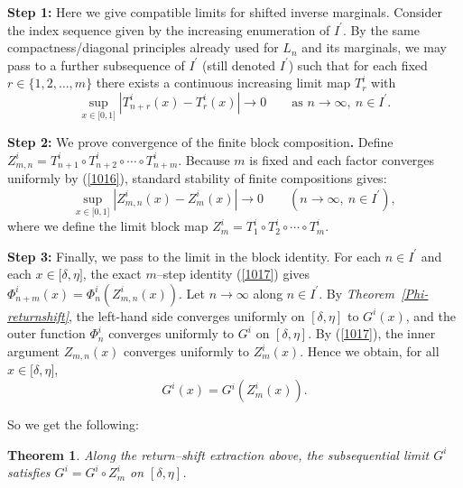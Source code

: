 \documentclass[onecolumn]{article}
\newtheorem{theorem}{Theorem}
\begin{document}
\medskip \noindent \textbf{Step 1: }Here we give compatible limits for
shifted inverse marginals. Consider the index sequence given by the
increasing enumeration of $I^{\prime }$. By the same compactness/diagonal
principles already used for $L_{n}$ and its marginals, we may pass to a
further subsequence of $I^{\prime }$ (still denoted $I^{\prime }$) such that
for each fixed $r\in \{1,2,\dots ,m\}$ there exists a continuous increasing
limit map $T_{r}^{i}$ with 
\begin{equation}
\sup_{x\in \lbrack 0,1]}\left\vert T_{n+r}^{i}(x)-T_{r}^{i}(x)\right\vert
\rightarrow 0\qquad \text{as }n\rightarrow \infty ,\ n\in I^{\prime }.
\label{1016}
\end{equation}

\medskip \noindent \textbf{Step 2: }We prove convergence of the finite block
composition\textbf{.} Define $Z_{m,n}^{i}=T_{n+1}^{i}\circ T_{n+2}^{i}\circ
\cdots \circ T_{n+m}^{i}$. Because $m$ is fixed and each factor converges
uniformly by (\ref{1016}), standard stability of finite compositions gives: 
\begin{equation}
\sup_{x\in \lbrack 0,1]}|Z_{m,n}^{i}(x)-Z_{m}^{i}(x)|\rightarrow 0\qquad
(n\rightarrow \infty ,\ n\in I^{\prime }),  \label{1017}
\end{equation}%
where we define the limit block map $Z_{m}^{i}=T_{1}^{i}\circ T_{2}^{i}\circ
\cdots \circ T_{m}^{i}$.

\medskip \noindent \textbf{Step 3:} Finally, we pass to the limit in the
block identity. For each $n\in I^{\prime }$ and each $x\in \lbrack \delta
,\eta ]$, the exact $m$--step identity (\ref{1017}) gives $\Phi
_{n+m}^{i}(x)=\Phi _{n}^{i}\!(Z_{m,n}^{i}(x))$. Let $n\rightarrow \infty $
along $n\in I^{\prime }$. By \textit{Theorem~\ref{Phi-returnshift}}, the
left-hand side converges uniformly on $[\delta ,\eta ]$ to $G^{i}(x)$, and
the outer function $\Phi _{n}^{i}$ converges uniformly to $G^{i}$ on $%
[\delta ,\eta ]$. By (\ref{1017}), the inner argument $Z_{m,n}(x)$ converges
uniformly to $Z_{m}^{i}(x)$. Hence we obtain, for all $x\in \lbrack \delta
,\eta ]$, 
\begin{equation}
G^{i}(x)=G\!^{i}(Z_{m}^{i}(x)).  \label{1018}
\end{equation}

So we get the following:

\begin{theorem}
\label{G-invariance} Along the return--shift extraction above, the
subsequential limit $G^{i}$ satisfies $G^{i}=G^{i}\circ Z_{m}^{i}$ on $%
[\delta ,\eta ]$.
\end{theorem}
\end{document}
